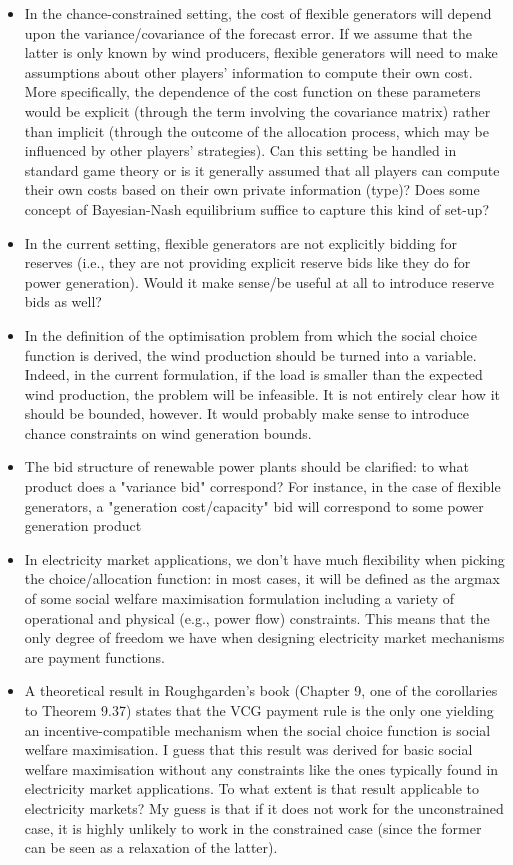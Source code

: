 \documentclass{article}
\begin{document}
\begin{itemize}
\item In the chance-constrained setting, the cost of flexible generators will depend upon the variance/covariance of the forecast error. If we assume that the latter is only known by wind producers, flexible generators will need to make assumptions about other players' information to compute their own cost. More specifically, the dependence of the cost function on these parameters would be explicit (through the term involving the covariance matrix) rather than implicit (through the outcome of the allocation process, which may be influenced by other players' strategies). Can this setting be handled in standard game theory or is it generally assumed that all players can compute their own costs based on their own private information (type)? Does some concept of Bayesian-Nash equilibrium suffice to capture this kind of set-up?
\item In the current setting, flexible generators are not explicitly bidding for reserves (i.e., they are not providing explicit reserve bids like they do for power generation). Would it make sense/be useful at all to introduce reserve bids as well?
\item In the definition of the optimisation problem from which the social choice function is derived, the wind production should be turned into a variable. Indeed, in the current formulation, if the load is smaller than the expected wind production, the problem will be infeasible. It is not entirely clear how it should be bounded, however. It would probably make sense to introduce chance constraints on wind generation bounds. 
\item The bid structure of renewable power plants should be clarified: to what product does a "variance bid" correspond? For instance, in the case of flexible generators, a "generation cost/capacity" bid will correspond to some power generation product 
\item In electricity market applications, we don't have much flexibility when picking the choice/allocation function: in most cases, it will be defined as the argmax of some social welfare maximisation formulation including a variety of operational and physical (e.g., power flow) constraints. This means that the only degree of freedom we have when designing electricity market mechanisms are payment functions. 
\item A theoretical result in Roughgarden's book (Chapter 9, one of the corollaries to Theorem 9.37) states that the VCG payment rule is the only one yielding an incentive-compatible mechanism when the social choice function is social welfare maximisation. I guess that this result was derived for basic social welfare maximisation without any constraints like the ones typically found in electricity market applications. To what extent is that result applicable to electricity markets? My guess is that if it does not work for the unconstrained case, it is highly unlikely to work in the constrained case (since the former can be seen as a relaxation of the latter).

\end{itemize}
\end{document}
